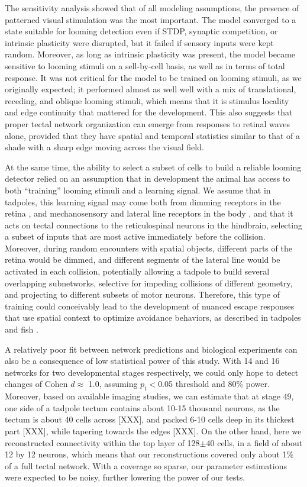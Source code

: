 \documentclass{article}
\begin{document}
The sensitivity analysis showed that of all modeling assumptions, the presence of patterned visual stimulation was the most important. The model converged to a state suitable for looming detection even if STDP, synaptic competition, or intrinsic plasticity were disrupted, but it failed if sensory inputs were kept random. Moreover, as long as intrinsic plasticity was present, the model became sensitive to looming stimuli on a sell-by-cell basis, as well as in terms of  total response. It was not critical for the model to be trained on looming stimuli, as we originally expected; it performed almost as well well with a mix of translational, receding, and oblique looming stimuli, which means that it is stimulus locality and edge continuity that mattered for the development. This also suggests that proper tectal network organization can emerge from responses to retinal waves alone, provided that they have spatial and temporal statistics similar to that of a shade with a sharp edge moving across the visual field.

At the same time, the ability to select a subset of cells to build a reliable looming detector relied on an assumption that in development the animal has access to both “training” looming stimuli and a learning signal. We assume that in tadpoles, this learning signal may come both from dimming receptors in the retina \citep{baranauskas2012}, and mechanosensory and lateral line receptors in the body \citep{truszkowski2017}, and that it acts on tectal connections to the reticulospinal neurons in the hindbrain, selecting a subset of inputs that are most active immediately before the collision. Moreover, during random encounters with spatial objects, different parts of the retina would be dimmed, and different segments of the lateral line would be activated in each collision, potentially allowing a tadpole to build several overlapping subnetworks, selective for impeding collisions of different geometry, and projecting to different subsets of motor neurons. Therefore, this type of training could conceivably lead to the development of nuanced escape responses that use spatial context to optimize avoidance behaviors, as described in tadpoles \citep{khakhalin2014} and fish \citep{bhattacharyya2017assessment}.

A relatively poor fit between network predictions and biological experiments can also be a consequence of low statistical power of this study. With 14 and 16 networks for two developmental stages respectively, we could only hope to detect changes of Cohen $d \approx$ 1.0, assuming $p_t<$0.05 threshold and 80\% power. Moreover, based on available imaging studies, we can estimate that at stage 49, one side of a tadpole tectum contains about 10-15 thousand neurons, as the tectum is about 40 cells across [XXX], and packed 6-10 cells deep in its thickest part [XXX], while tapering towards the edges [XXX]. On the other hand, here we reconstructed connectivity within the top layer of 128$\pm$40 cells, in a field of about 12 by 12 neurons, which means that our reconstructions covered only about 1\% of a full tectal network. With a coverage so sparse, our parameter estimations were expected to be noisy, further lowering the power of our tests.
\end{document}

